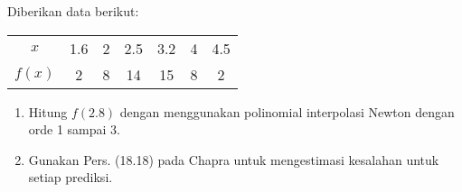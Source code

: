 \begin{soal}

Diberikan data berikut:

{\centering
\begin{tabular}{|c|cccccc|}
\hline
$x$    & 1.6 & 2 & 2.5 & 3.2 & 4 & 4.5 \\
$f(x)$ & 2   & 8 & 14  & 15  & 8 & 2 \\
\hline
\end{tabular}
\par}

\begin{enumerate}[label=(\alph*)]
\item Hitung $f(2.8)$ dengan menggunakan polinomial interpolasi Newton dengan orde 1 sampai 3.
\item Gunakan Pers. (18.18) pada Chapra untuk mengestimasi kesalahan untuk setiap prediksi.
\end{enumerate}

\end{soal}